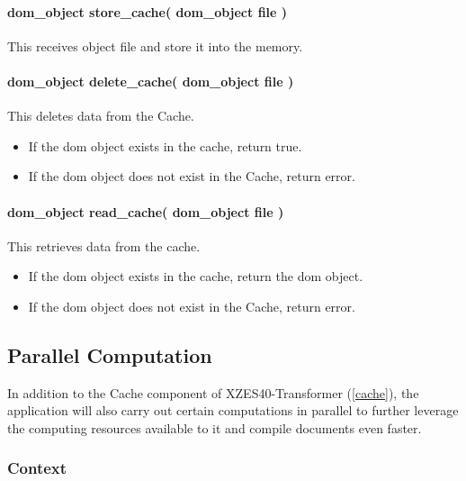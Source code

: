 \paragraph{dom\_object store\_cache( dom\_object file )} 
This receives object file and store it into the memory.

\paragraph{dom\_object delete\_cache( dom\_object file )}
This deletes data from the Cache.

\begin{itemize}
    \item If the \gls{dom} object exists in the cache, return true.
    \item If the \gls{dom} object does not exist in the Cache, return error.
\end{itemize}

\paragraph{dom\_object read\_cache( dom\_object file )} 
This retrieves data from the cache.

\begin{itemize}
    \item If the \gls{dom} object exists in the cache, return the \gls{dom} object.
    \item If the \gls{dom} object does not exist in the Cache, return error.
\end{itemize}

\subsection{Parallel Computation}
\label{parallel-computation}

In addition to the Cache component of XZES40-Transformer (\ref{cache}), the application will also carry out certain computations in parallel to further leverage the computing resources available to it and compile documents even faster.

\subsubsection{Context}

